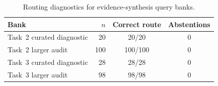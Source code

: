 \begin{table}
\centering
\scriptsize
\caption{Routing diagnostics for evidence-synthesis query banks.}
\label{tab:routing-diagnostics}
\setlength{\tabcolsep}{4pt}
\renewcommand{\arraystretch}{1.05}
\begin{tabular}{l r c c}
\toprule
\textbf{Bank} & \textbf{$n$} & \textbf{Correct route} & \textbf{Abstentions} \\
\midrule
Task~2 curated diagnostic & 20 & 20/20 & 0 \\
Task~2 larger audit & 100 & 100/100 & 0 \\
Task~3 curated diagnostic & 28 & 28/28 & 0 \\
Task~3 larger audit & 98 & 98/98 & 0 \\
\bottomrule
\end{tabular}
\end{table}
